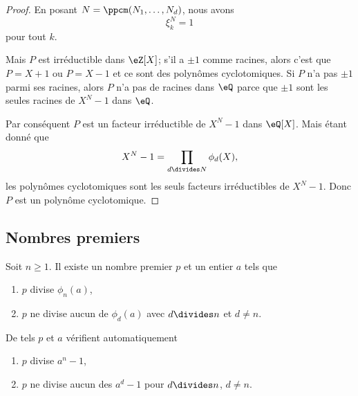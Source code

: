 \begin{proof}
    En posant \( N=\ppcm(N_1,\ldots, N_d)\), nous avons
    \begin{equation}
        \xi_k^N=1
    \end{equation}
    pour tout \( k\).

    Mais \( P\) est irréductible dans \( \eZ[X]\); s'il a \( \pm 1\) comme racines, alors c'est que \( P=X+1\) ou \( P=X-1\) et ce sont des polynômes cyclotomiques. Si \( P\) n'a pas \( \pm 1\) parmi ses racines, alors \( P\) n'a pas de racines dans \( \eQ\) parce que \( \pm 1\) sont les seules racines de \( X^N-1\) dans \( \eQ\).

    Par conséquent \( P\) est un facteur irréductible de \( X^N-1\) dans \( \eQ[X]\). Mais étant donné que
    \begin{equation}
        X^N-1=\prod_{d\divides N}\phi_d(X),
    \end{equation}
    les polynômes cyclotomiques sont les seuls facteurs irréductibles de \( X^N-1\). Donc \( P\) est un polynôme cyclotomique.
\end{proof}

\subsection{Nombres premiers}

\begin{lemma}    \label{LemiAqLEn}
    Soit \( n\geq 1\). Il existe un nombre premier \( p\) et un entier \( a\) tels que
    \begin{enumerate}
        \item
            \( p\) divise \( \phi_n(a)\),
        \item
            \( p\) ne divise aucun de \( \phi_d(a)\) avec \( d\divides n\) et \( d\neq n\).
    \end{enumerate}
    De tels \( p\) et \( a\) vérifient automatiquement
    \begin{enumerate}
        \item
            \( p\) divise \( a^n-1\),
        \item
            \( p\) ne divise aucun des \( a^d-1\) pour \( d\divides n\), \( d\neq n\).
    \end{enumerate}
\end{lemma}

